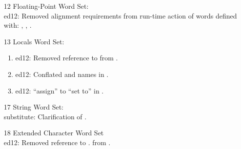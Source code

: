 \begin{itemize}
	\item[12] Floating-Point Word Set:			%
		\\ \textsf{ed12}: Removed alignment requirements from run-time action of
			words defined with:
			,
			,
			.

	\item[13] Locals Word Set:						%
		\begin{enumerate}
		\item \textsf{ed12}: Removed reference to  from .
		\item \textsf{ed12}: Conflated  and  names in .
		\item \textsf{ed12}: ``assign'' to ``set to'' in .
		\end{enumerate}

	\item[17] String Word Set:						%
		\\ \textsf{substitute}: Clarification of .

	\item[18] Extended Character Word Set		%
		\\ \textsf{ed12}: Removed reference to . from .


\end{itemize}
